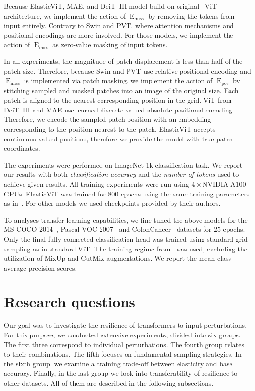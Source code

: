 \documentclass[10pt,twocolumn,letterpaper]{article}
\newcommand{\ours}[0]{ElasticViT\xspace}
\DeclareMathOperator{\E}{E}
\DeclareMathOperator{\miss}{miss}
\DeclareMathOperator{\pos}{pos}
\begin{document}
Because \ours, MAE, and DeiT~III model build on original~\cite{dosovitskiy2020vit} ViT architecture, we implement the action of $\E_{\miss}$ by removing the tokens from input entirely. Contrary to Swin and PVT, where attention mechanisms and positional encodings are more involved. For those models, we implement the action of $\E_{\miss}$ as zero-value masking of input tokens.

In all experiments, the magnitude of patch displacement is less than half of the patch size. Therefore, because Swin and PVT use relative positional encoding and $\E_{\miss}$ is implemented via patch masking, we implement the action of $\E_{\pos}$ by stitching sampled and masked patches into an image of the original size. Each patch is aligned to the nearest corresponding position in the grid.
ViT from DeiT~III and MAE use learned discrete-valued absolute positional encoding. Therefore, we encode the sampled patch position with an embedding corresponding to the position nearest to the patch.
\ours{} accepts continuous-valued positions, therefore we provide the model with true patch coordinates.

The experiments were performed on ImageNet-1k classification task. We report our results with both \textit{classification accuracy} and the \textit{number of tokens} used to achieve given results.
All training experiments were run using $4\times$NVIDIA A100 GPUs. \ours{} was trained for 800 epochs using the same training parameters as in~\cite{touvron2022deit}. For other models we used checkpoints provided by their authors.

To analyses transfer learning capabilities, we fine-tuned the above models for the MS COCO 2014~\cite{lin2014microsoft}, Pascal VOC 2007~\cite{everingham2009pascal} and ColonCancer~\cite{sirinukunwattana2016locality} datasets for $25$ epochs. Only the final fully-connected classification head was trained using standard grid sampling as in standard ViT. The training regime from~\cite{touvron2022deit} was used, excluding the utilization of MixUp and CutMix augmentations. We report the mean class average precision scores.



\section{Research questions} \label{research_questions}
Our goal was to investigate the resilience of transformers to input perturbations. For this purpose, we conducted extensive experiments, divided into six groups. The first three correspond to individual perturbations. The fourth group relates to their combinations. The fifth focuses on fundamental sampling strategies. In the sixth group, we examine a training trade-off between elasticity and base accuracy. Finally, in the last group we look into transferability of resilience to other datasets. All of them are described in the following subsections.
\end{document}
